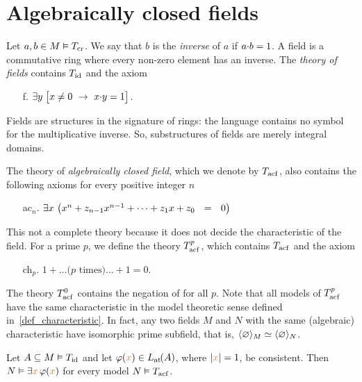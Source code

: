 \documentclass[creche.tex]{subfiles}
\begin{document}
\section{Algebraically closed fields}

Let $a,b\in M\models T_{\rm cr}$. We say that $b$ is the \emph{inverse\/} of $a$ if $a\mdot b=1$. A field is a commutative ring where every non-zero element has an inverse. The \emph{theory of fields\/} contains $T_{\rm id}$ and the axiom
\begin{itemize}
\item[f.]$\E  y\; \big[x\neq0\ \imp\ x\mdot y =1\big]$.
\end{itemize}
Fields are structures in the signature of rings: the language contains no symbol for the multiplicative inverse. So, substructures of fields are merely integral domains.

The theory of \emph{algebraically closed field}, which we denote by \emph{$T_{\rm acf}$}, also contains the following axioms for every positive integer $n$

\begin{itemize}
\item[ac$_n$.] $\E x\ \big(x^{n} + z_{n-1}x^{n-1} + \dots + z_1 x + z_0\ \ =\ \ 0\big)$
\end{itemize}

This not a complete theory because it does not decide the characteristic of the field. For a prime $p$, we define the theory \emph{$T^p_{\rm acf}$}, which contains $T_{\rm acf}$ and the axiom
\begin{itemize}
\item[ch$_p$.]$1+\dots \mbox{($p$ times)}\dots +1=0$.
\end{itemize}
The theory \emph{$T^0_{\rm acf}$\/} contains the negation of  for all $p$. Note that all models of $T^p_{\rm acf}$ have the same characteristic in the model theoretic sense defined in~\ref{def_characteristic}. In fact, any two fields $M$ and $N$ with the same (algebraic) characteristic have isomorphic prime subfield, that is, $\<\0\>_M \simeq \<\0\>_N$.

\begin{proposition}\label{prop_acf_cons_sodd}
Let $A\subseteq M\models T_{\rm id}$ and let $\phi({\mr x})\in\atL(A)$, where $|{\mr x}|=1$, be consistent. Then $N\models\E {\mr x} \,\phi({\mr x})$ for every model $N\models T_{\rm acf}$.
\end{proposition}
\end{document}
